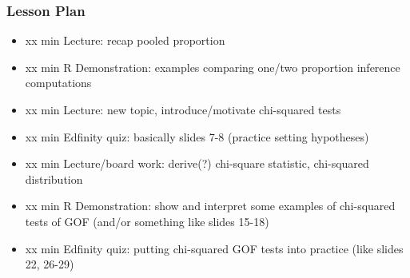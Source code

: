 \begin{frame}
    \frametitle{Lesson Plan}
    \begin{itemize}
        \item xx min Lecture: recap pooled proportion
        \item xx min R Demonstration: examples comparing one/two proportion inference computations
        \item xx min Lecture: new topic, introduce/motivate chi-squared tests
        \item xx min Edfinity quiz: basically slides 7-8 (practice setting hypotheses)
        \item xx min Lecture/board work: derive(?) chi-square statistic, chi-squared distribution
        \item xx min R Demonstration: show and interpret some examples of chi-squared tests of GOF (and/or something like slides 15-18)
        \item xx min Edfinity quiz: putting chi-squared GOF tests into practice (like slides 22, 26-29)
    \end{itemize}
\end{frame}
            
    


